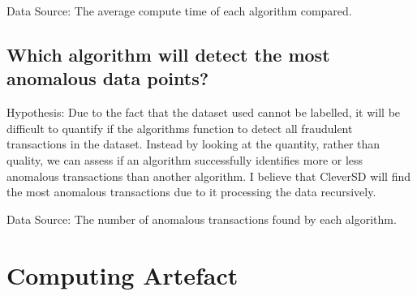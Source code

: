 \documentclass[journal]{IEEEtran}
\begin{document}
\noindent
Data Source: The average compute time of each algorithm compared.

\subsection{Which algorithm will detect the most anomalous data points?}
\noindent
Hypothesis: Due to the fact that the dataset used cannot be labelled, it will be difficult to quantify if the algorithms function to detect all fraudulent transactions in the dataset. Instead by looking at the quantity, rather than quality, we can assess if an algorithm successfully identifies more or less anomalous transactions than another algorithm. I believe that CleverSD will find the most anomalous transactions due to it processing the data recursively.

\noindent
Data Source: The number of anomalous transactions found by each algorithm.

\section{Computing Artefact}
\end{document}
